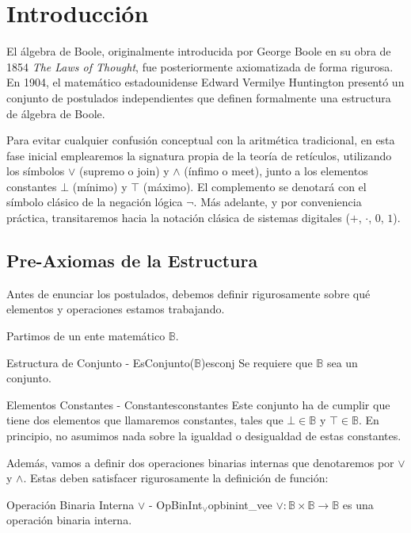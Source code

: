\chapter{Introducción}
El álgebra de Boole, originalmente introducida por George Boole en su obra de 1854 \textit{The Laws of Thought}, fue posteriormente axiomatizada de forma rigurosa. En 1904, el matemático estadounidense Edward Vermilye Huntington presentó un conjunto de postulados independientes que definen formalmente una estructura de álgebra de Boole. 

Para evitar cualquier confusión conceptual con la aritmética tradicional, en esta fase inicial emplearemos la signatura propia de la teoría de retículos, utilizando los símbolos $\vee$ (supremo o join) y $\wedge$ (ínfimo o meet), junto a los elementos constantes $\bot$ (mínimo) y $\top$ (máximo). El complemento se denotará con el símbolo clásico de la negación lógica $\neg$. Más adelante, y por conveniencia práctica, transitaremos hacia la notación clásica de sistemas digitales ($+$, $\cdot$, $0$, $1$).

\section{Pre-Axiomas de la Estructura}
Antes de enunciar los postulados, debemos definir rigurosamente sobre qué elementos y operaciones estamos trabajando. 

Partimos de un ente matemático $\mathbb{B}$.

\begin{preaxioma}{Estructura de Conjunto - EsConjunto($\mathbb{B}$)}{esconj}
Se requiere que $\mathbb{B}$ sea un conjunto.
\end{preaxioma}

\begin{preaxioma}{Elementos Constantes - Constantes}{constantes}
Este conjunto ha de cumplir que tiene dos elementos que llamaremos constantes, tales que $\bot \in \mathbb{B}$ y $\top \in \mathbb{B}$. En principio, no asumimos nada sobre la igualdad o desigualdad de estas constantes.
\end{preaxioma}

Además, vamos a definir dos operaciones binarias internas que denotaremos por $\vee$ y $\wedge$. Estas deben satisfacer rigurosamente la definición de función:

\begin{preaxioma}{Operación Binaria Interna $\vee$ - OpBinInt$_\vee$}{opbinint_vee}
$\vee : \mathbb{B} \times \mathbb{B} \to \mathbb{B}$ es una operación binaria interna.
\end{preaxioma}


